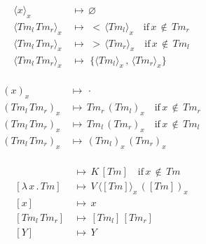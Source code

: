 \documentclass{IEEEtran}
\begin{document}
\begin{align*}
\langle x \rangle _x \, &\mapsto \, \varnothing \\
\langle Tm _l \, Tm _r \rangle _x \, &\mapsto \, \, < \, \langle Tm _l \rangle _x \quad \text{if} \, x \, \notin \, Tm _r \\
\langle Tm _l \, Tm _r \rangle _x \, &\mapsto \, \, > \, \langle Tm _r \rangle _x \quad \text{if} \, x \, \notin \, Tm _l \\
\langle Tm _l \, Tm _r \rangle _x \, &\mapsto \, \, \{ \langle Tm _l \rangle _x \, , \, \langle Tm _r \rangle _x \} \\
\end{align*}

\begin{align*}
( x ) _x \, &\mapsto \, \cdot \\
( Tm _l \, Tm _r ) _x \, &\mapsto \, Tm _r \, ( Tm _l ) _x \quad \text{if} \, x \, \notin \, Tm _r \\
( Tm _l \, Tm _r ) _x \, &\mapsto \, Tm _l \, ( Tm _r ) _x \quad \text{if} \, x \, \notin \, Tm _l \\
( Tm _l \, Tm _r ) _x \, &\mapsto \, ( Tm _l ) _x \, ( Tm _r ) _x \\
\end{align*}

\begin{align*}
[\lambda \, x \, . \, Tm] \, &\mapsto \, K \, [Tm] \quad \text{if} \, x \, \notin \, Tm \\
[\lambda \, x \, . \, Tm] \, &\mapsto \, V \, \langle [Tm] \rangle _x \, ( [Tm] ) _x \\
[x] \, &\mapsto \, x \\
[Tm_l \, Tm_r] \, &\mapsto \, [Tm_l] \, [Tm_r] \\
[Y] \, &\mapsto \, Y
\end{align*}

\begingroup
\vspace*{-\baselineskip}
\vspace*{\baselineskip}
\endgroup
\end{document}
